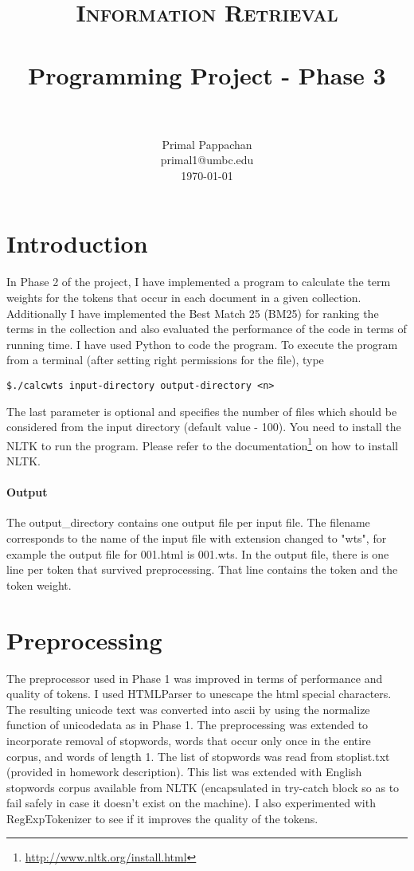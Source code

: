 \documentclass[paper=a4, fontsize=11pt]{scrartcl}
\title{
		\usefont{OT1}{bch}{b}{n}
		\normalfont \normalsize \textsc{Information Retrieval} \\ [25pt]
		\horrule{0.5pt} \\[0.4cm]
		\huge Programming Project - Phase 3 \\
		\horrule{2pt} \\[0.5cm]
}
\author{
		\normalfont 								\normalsize
        Primal Pappachan\\[-3pt]		\normalsize
        primal1@umbc.edu\\[-3pt]		\normalsize
        \today
}
\date{}
\numberwithin{equation}{section}		%
\numberwithin{figure}{section}			%
\numberwithin{table}{section}				%
\begin{document}
\maketitle
\section{Introduction}
In Phase 2 of the project, I have implemented a program to calculate the term weights for the tokens that occur in each document in a given collection. Additionally I have implemented the Best Match 25 (BM25) for ranking the terms in the collection and also evaluated the performance of the code in terms of running time. I have used Python to code the program. To execute the program from a terminal (after setting right permissions for the file), type 

\begin{verbatim}
$./calcwts input-directory output-directory <n>
\end{verbatim}

The last parameter is optional and specifies the number of files which should be considered from the input directory (default value - 100). You need to install the NLTK to run the program. Please refer to the documentation\footnote{\url{http://www.nltk.org/install.html}} on how to install NLTK.

\paragraph{Output}

The output\_directory contains one output file per input file. The filename corresponds to the name of the input file with extension changed to "wts", for example the output file for 001.html is 001.wts. In the output file, there is one line per token that survived preprocessing. That line contains the token and the token weight.

\section{Preprocessing}

The preprocessor used in Phase 1 was improved in terms of performance and quality of tokens. I used HTMLParser to unescape the html special characters. The resulting unicode text was converted into ascii by using the normalize function of unicodedata as in Phase 1. The preprocessing was extended to incorporate removal of stopwords, words that occur only once in the entire corpus, and words of length 1. The list of stopwords was read from stoplist.txt (provided in homework description). This list was extended with English stopwords corpus available from NLTK (encapsulated in try-catch block so as to fail safely in case it doesn't exist on the machine). I also experimented with RegExpTokenizer to see if it improves the quality of the tokens.
\end{document}
